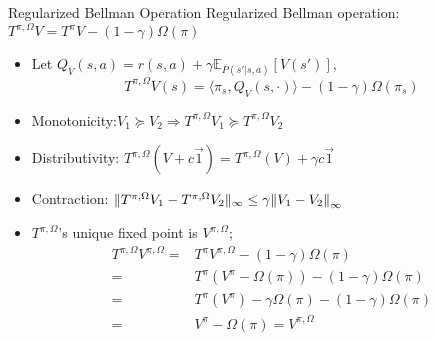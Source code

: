\documentclass{beamer}
\begin{document}
\begin{frame}[t]{Regularized Bellman Operation}
    Regularized Bellman operation: $ T^{\pi,\Omega}V = T^{\pi} V - (1-\gamma)\Omega(\pi)$\\
        \begin{itemize}
            \item Let $ Q_V(s,a) = r(s,a) + \gamma \mathbb{E}_{P(s'|s,a)}\left[ V(s') \right] $,
                \[
                    T^{\pi,\Omega}V (s) = \langle \pi_s, Q_V(s, \cdot) \rangle - (1 - \gamma)\Omega(\pi_s)
                \]
            \item Monotonicity:$ V_1 \succeq V_2 \Rightarrow T^{\pi, \Omega}V_1 \succeq T^{\pi, \Omega}V_2 $
            \item Distributivity: $ T^{\pi, \Omega}(V + c \vec{1}) =  T^{\pi, \Omega}(V) + \gamma c \vec{1} $
            \item Contraction: $ \Arrowvert T^{\pi, \Omega}V_1 - T^{\pi, \Omega}V_2 \Arrowvert_{\infty} \le \gamma {\Arrowvert V_1 - V_2 \Arrowvert}_\infty $
            \item $ T^{\pi,\Omega} $'s unique fixed point is $ V^{\pi, \Omega} $;
                \begin{align*}
                    T^{\pi, \Omega}V^{\pi, \Omega} =& T^{\pi}V^{\pi, \Omega} - (1 - \gamma) \Omega(\pi)\\
                    =& T^{\pi}\left( V^{\pi} - \Omega(\pi) \right) - (1 - \gamma) \Omega(\pi)\\
                    =& T^{\pi}(V^{\pi}) - \gamma \Omega(\pi) - (1-\gamma) \Omega(\pi)\\
                    =& V^{\pi} - \Omega(\pi) = V^{\pi, \Omega}
                \end{align*}
        \end{itemize}
\end{frame}
\end{document}
